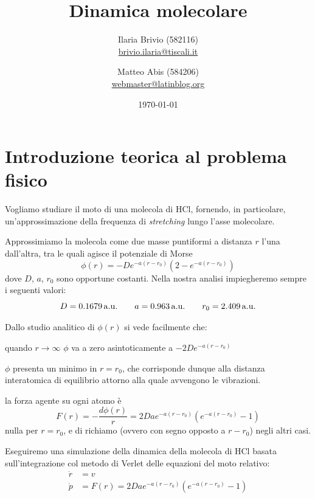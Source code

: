 \documentclass[italian,a4paper]{article}
\newenvironment{packed_enum}{
\begin{itemize}
  \setlength{\itemsep}{1pt}
  \setlength{\parskip}{0pt}
  \setlength{\parsep}{0pt}
}{\end{itemize}}
\newcommand{\f}{\phi}
\begin{document}
\title{Dinamica molecolare}
\author{\normalsize Ilaria Brivio (582116)\\%
\normalsize \url{brivio.ilaria@tiscali.it}%
\and %
\normalsize Matteo Abis (584206)\\ %
\normalsize \url{webmaster@latinblog.org}}
\date{\today}
\maketitle
\section{Introduzione teorica al problema fisico}
Vogliamo studiare il moto di una molecola di HCl, fornendo, in particolare, un'approssimazione della frequenza di \textit{stretching} lungo l'asse molecolare.

Approssimiamo la molecola come due masse puntiformi a distanza $r$ l'una dall'altra, tra le quali agisce il potenziale di Morse
\begin{equation*}
\f(r)= -D e^{-a(r-r_0)} \left(2-e^{-a(r-r_0)}\right)
\end{equation*}
dove $D$, $a$, $r_0$ sono opportune costanti. Nella nostra analisi impiegheremo sempre i seguenti valori:
\begin{equation*}
D=\unit[0.1679]{a.u.} \qquad a=\unit[0.963]{a.u.} \qquad r_0=\unit[2.409]{a.u.}
\end{equation*}

Dallo studio analitico di $\f(r)$ si vede facilmente che:
\begin{packed_enum}
\item quando $r\rightarrow\infty$ $\f$ va a zero asintoticamente a $-2D e^{-a(r-r_0)}$
\item $\f$ presenta un minimo in $r=r_0$, che corrisponde dunque alla distanza interatomica di equilibrio attorno alla quale avvengono le vibrazioni.
\item la forza agente su ogni atomo \`e 
\begin{equation*}
F(r)=-\dfrac{d\f(r)}{r}= 2Da e^{-a(r-r_0)}\left(e^{-a(r-r_0)}-1\right)
\end{equation*}
nulla per $r=r_0$, e di richiamo (ovvero con segno opposto a $r-r_0$) negli altri casi.
\end{packed_enum}

Eseguiremo una simulazione della dinamica della molecola di HCl basata sull'integrazione col metodo di Verlet delle equazioni del moto relativo:
\begin{align*}
\dot{r}&=v\\
\dot{p}&=F(r)=2Da e^{-a(r-r_0)}\left(e^{-a(r-r_0)}-1\right)
\end{align*}
\end{document}
